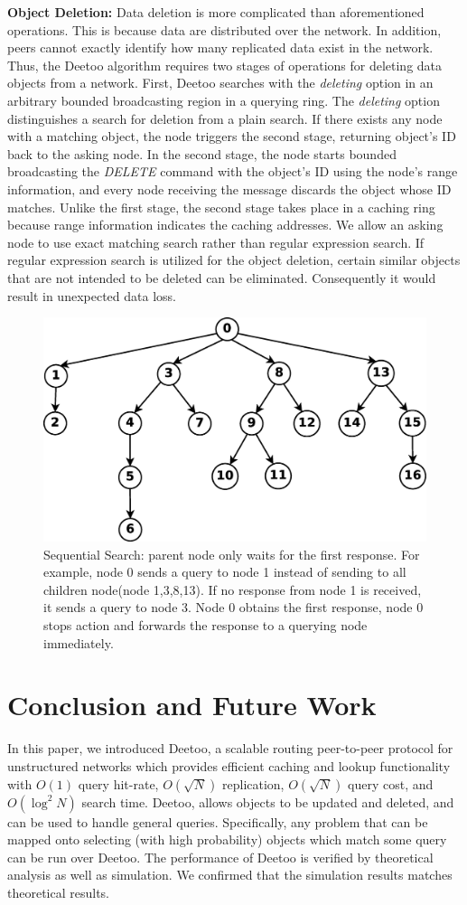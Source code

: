 \documentclass[9.5pt,journal,final,finalsubmission,twocolumn]{IEEEtran}
\begin{document}
\textbf{Object Deletion:} Data deletion is more complicated than aforementioned operations.
This is because data are distributed over the network. In addition, peers cannot exactly identify 
how many replicated data exist in the network.
Thus, the Deetoo algorithm requires two stages of operations for deleting data objects from a network. 
First, Deetoo searches with the \textit{deleting} option 
in an arbitrary bounded broadcasting region in a querying ring. The \textit{deleting} 
option distinguishes a search for deletion from a plain search.
If there exists any node with a matching object, the node triggers the second stage, returning 
object's ID back to the asking node. 
In the second stage, the node starts bounded broadcasting the \textit{DELETE} command with the object's ID using 
the node's range information, and every node receiving the message discards the object whose ID matches.
Unlike the first stage, the second stage takes place in a caching ring because range 
information indicates the caching addresses.
We allow an asking node to use exact matching search rather than regular expression search. 
If regular expression search is utilized for the object deletion, 
certain similar objects that are not intended to be deleted can be eliminated. 
Consequently it would result in unexpected data loss.

\begin{figure}
\centering
\includegraphics[width=3 in]{regextree}
\caption{Sequential Search: parent node only waits for the first response. For example, 
node 0 sends a query to node 1 instead of sending to all children node(node 1,3,8,13). 
If no response from node 1 is received, it sends a query to node 3. Node 0 obtains the first 
response, node 0 stops action and forwards the response to a querying node immediately.} 
\label{fig:regextree}
\end{figure}
\fi

\section{Conclusion and Future Work}
\label{sec:conclusion}
In this paper, we introduced Deetoo, a scalable routing peer-to-peer
protocol for unstructured networks which provides efficient caching
and lookup functionality with $O(1)$ query hit-rate, $O(\sqrt N)$
replication, $O(\sqrt{N})$ query cost, and $O(\log^2 N)$ search time.
Deetoo, allows objects to be updated and deleted, and can
be used to handle general queries.  Specifically, any problem
that can be mapped onto selecting (with high probability) objects
which match some query can be run over Deetoo.
The performance of Deetoo is verified by theoretical analysis as well 
as simulation. We confirmed that the simulation results
matches theoretical results.
\end{document}
